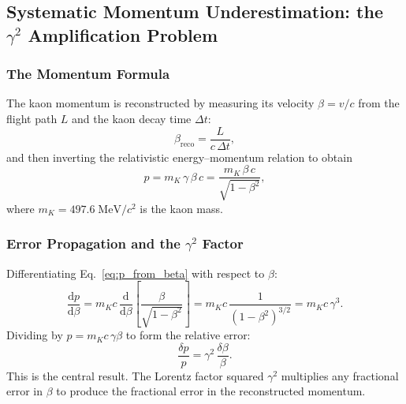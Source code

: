 %
%

\subsection{Systematic Momentum Underestimation: the $\gamma^2$ Amplification Problem}

\subsubsection{The Momentum Formula}

The kaon momentum is reconstructed by measuring its velocity $\beta = v/c$ from the
flight path $L$ and the kaon decay time $\Delta t$:
\begin{equation}
  \beta_{\text{reco}} = \frac{L}{c\,\Delta t},
  \label{eq:beta_reco}
\end{equation}
and then inverting the relativistic energy–momentum relation to obtain
\begin{equation}
  p = m_K\,\gamma\,\beta\,c = \frac{m_K\,\beta\,c}{\sqrt{1-\beta^2}},
  \label{eq:p_from_beta}
\end{equation}
where $m_K = 497.6\;\text{MeV}/c^2$ is the kaon mass.

\subsubsection{Error Propagation and the $\gamma^2$ Factor}

Differentiating Eq.~\eqref{eq:p_from_beta} with respect to $\beta$:
\begin{equation}
  \frac{\mathrm{d}p}{\mathrm{d}\beta}
  = m_K c\,\frac{\mathrm{d}}{\mathrm{d}\beta}\!\left[\frac{\beta}{\sqrt{1-\beta^2}}\right]
  = m_K c\,\frac{1}{(1-\beta^2)^{3/2}}
  = m_K c\,\gamma^3.
  \label{eq:dp_dbeta}
\end{equation}
Dividing by $p = m_K c\,\gamma\beta$ to form the relative error:
\begin{equation}
  \boxed{
  \frac{\delta p}{p} = \gamma^2\,\frac{\delta\beta}{\beta}.
  }
  \label{eq:gamma2_amplification}
\end{equation}
This is the central result.  The Lorentz factor squared $\gamma^2$ multiplies any
fractional error in $\beta$ to produce the fractional error in the reconstructed momentum.

